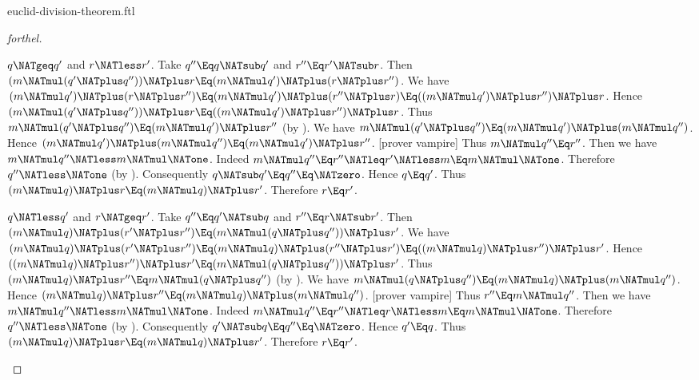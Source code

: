 \documentclass{stex}
\begin{document}
\begin{smodule}{euclid-division-theorem.ftl}
\begin{proof}[forthel]
  \begin{case}{$q \NATgeq q'$ and $r \NATless r'$.}
    Take $q'' \Eq q \NATsub q'$ and $r'' \Eq r' \NATsub r$.
    Then $(m \NATmul (q' \NATplus q'')) \NATplus r \Eq (m \NATmul q') \NATplus (r \NATplus r'')$.
    We have $(m \NATmul q') \NATplus (r \NATplus r'')
      \Eq (m \NATmul q') \NATplus (r'' \NATplus r)
      \Eq ((m \NATmul q') \NATplus r'') \NATplus r$.
    Hence $(m \NATmul (q' \NATplus q'')) \NATplus r \Eq ((m \NATmul q') \NATplus r'') \NATplus r$.
    Thus $m \NATmul (q' \NATplus q'') \Eq (m \NATmul q') \NATplus r''$ (by ).
    We have $m \NATmul (q' \NATplus q'') \Eq (m \NATmul q') \NATplus (m \NATmul q'')$.
    Hence $(m \NATmul q') \NATplus (m \NATmul q'') \Eq (m \NATmul q') \NATplus r''$.
    [prover vampire]
    Thus $m \NATmul q'' \Eq r''$.
    Then we have $m \NATmul q'' \NATless m \NATmul \NATone$.
    Indeed $m \NATmul q''
      \Eq r''
      \NATleq r'
      \NATless m
      \Eq m \NATmul \NATone$.
    Therefore $q'' \NATless \NATone$ (by ).
    Consequently $q \NATsub q' \Eq q'' \Eq \NATzero$.
    Hence $q \Eq q'$.
    Thus $(m \NATmul q) \NATplus r \Eq (m \NATmul q) \NATplus r'$.
    Therefore $r \Eq r'$.
  \end{case}

  \begin{case}{$q \NATless q'$ and $r \NATgeq r'$.}
    Take $q'' \Eq q' \NATsub q$ and $r'' \Eq r \NATsub r'$.
    Then $(m \NATmul q) \NATplus (r' \NATplus r'') \Eq (m \NATmul (q \NATplus q'')) \NATplus r'$.
    We have $(m \NATmul q) \NATplus (r' \NATplus r'')
      \Eq (m \NATmul q) \NATplus (r'' \NATplus r')
      \Eq ((m \NATmul q) \NATplus r'') \NATplus r'$.
    Hence $((m \NATmul q) \NATplus r'') \NATplus r' \Eq (m \NATmul (q \NATplus q'')) \NATplus r'$.
    Thus $(m \NATmul q) \NATplus r'' \Eq m \NATmul (q \NATplus q'')$ (by ).
    We have $m \NATmul (q \NATplus q'') \Eq (m \NATmul q) \NATplus (m \NATmul q'')$.
    Hence $(m \NATmul q) \NATplus r'' \Eq (m \NATmul q) \NATplus (m \NATmul q'')$.
    [prover vampire]
    Thus $r'' \Eq m \NATmul q''$.
    Then we have $m \NATmul q'' \NATless m \NATmul \NATone$.
    Indeed $m \NATmul q''
      \Eq r''
      \NATleq r
      \NATless m
      \Eq m \NATmul \NATone$.
    Therefore $q'' \NATless \NATone$ (by ).
    Consequently $q' \NATsub q \Eq q'' \Eq \NATzero$.
    Hence $q' \Eq q$.
    Thus $(m \NATmul q) \NATplus r \Eq (m \NATmul q) \NATplus r'$.
    Therefore $r \Eq r'$.
  \end{case}


\end{proof}
\end{smodule}
\end{document}
